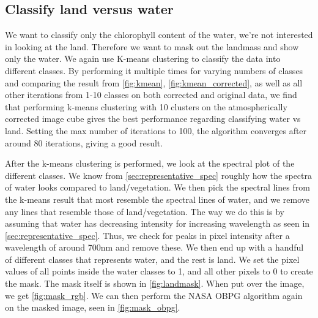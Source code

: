 \subsection{Classify land versus water}
\label{sec:landmask}

We want to classify only the chlorophyll content of the water, we're not interested 
in looking at the land. Therefore we want to mask out the landmass and show only 
the water. We again use K-means clustering to classify the data into different 
classes. By performing it multiple times for varying numbers of classes and comparing 
the result from \cref{fig:kmean}, \cref{fig:kmean_corrected}, as well as all other 
iterations from 1-10 classes on both corrected and original data, we find that 
performing k-means clustering with 10 clusters on the atmospherically corrected 
image cube gives the best performance regarding classifying water vs land. Setting 
the max number of iterations to 100, the algorithm converges after around 80 iterations, 
giving a good result. 

After the k-means clustering is performed, we look at the spectral plot of the 
different classes. We know from \cref{sec:representative_spec} roughly how the 
spectra of water looks compared to land/vegetation. We then pick the spectral lines 
from the k-means result that most resemble the spectral lines of water, and we remove 
any lines that resemble those of land/vegetation. The way we do this is by 
assuming that water has decreasing intensity for increasing wavelength as seen 
in \cref{sec:representative_spec}. Thus, we check for peaks in pixel intensity 
after a wavelength of around 700nm and remove these.
We then end up with a handful of 
different classes that represents water, and the rest is land. We set the pixel values 
of all points inside the water classes to 1, and all other pixels to 0 to create the 
mask. The mask itself is shown in \cref{fig:landmask}. When put over the image, we get 
\cref{fig:mask_rgb}. We can then perform the NASA OBPG algorithm again on the 
masked image, seen in \cref{fig:mask_obpg}.


